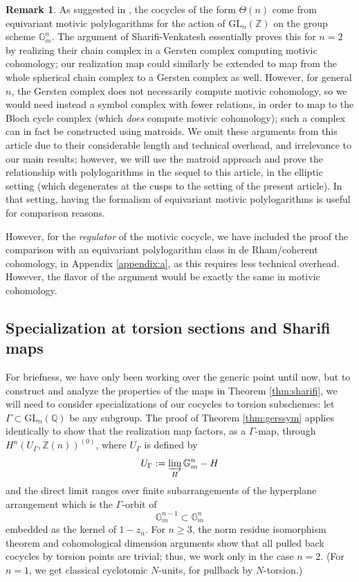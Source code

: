\documentclass[10pt]{amsart}
\theoremstyle{definition}
\newtheorem{rem}[thm]{Remark}
\newcommand{\Z}{\mathbb{Z}}
\newcommand{\G}{\mathbb{G}}
\newcommand{\GL}{\mathrm{GL}}
\numberwithin{equation}{section}
\begin{document}
    \begin{rem} \label{rem:eqpoly}
        As suggested in \cite[\S5]{SV}, the cocycles of the form $\Theta(n)$ come from equivariant motivic polylogarithms for the action of $\GL_n(\Z)$ on the group scheme $\G_m^n$. The argument of Sharifi-Venkatesh essentially proves this for $n=2$ by realizing their chain complex in a Gersten complex computing motivic cohomology; our realization map could similarly be extended to map from the whole spherical chain complex to a Gersten complex as well. However, for general $n$, the Gersten complex does not necessarily compute motivic cohomology, so we would need instead a symbol complex with fewer relations, in order to map to the Bloch cycle complex (which \emph{does} compute motivic cohomology); such a complex can in fact be constructed using matroids. We omit these arguments from this article due to their considerable length and technical overhead, and irrelevance to our main results; however, we will use the matroid approach and prove the relationship with polylogarithms in the sequel to this article, in the elliptic setting (which degenerates at the cusps to the setting of the present article). In that setting, having the formalism of equivariant motivic polylogarithms is useful for comparison reasons.

        However, for the \emph{regulator} of the motivic cocycle, we have included the proof the comparison with an equivariant polylogarithm class in de Rham/coherent cohomology, in Appendix \ref{appendix:a}, as this requires less technical overhead. However, the flavor of the argument would be exactly the same in motivic cohomology.
    \end{rem}

    \subsection{Specialization at torsion sections and Sharifi maps}
    
    For briefness, we have only been working over the generic point until now, but to construct and analyze the properties of the maps in Theorem \ref{thm:sharifi}, we will need to consider specializations of our cocycles to torsion subschemes: let $\Gamma\subset \mathrm{GL}_n(\mathbb{Q})$ be any subgroup. The proof of Theorem \ref{thm:gerssym} applies identically to show that the realization map factors, as a $\Gamma$-map, through $H^n(U_\Gamma, \Z(n))^{(0)}$, where $U_\Gamma$ is defined by
    \begin{equation} \label{eq:spreadgers}
        U_\Gamma := \varinjlim_H \mathbb{G}_m^n-H
    \end{equation}
    and the direct limit ranges over finite subarrangements of the hyperplane arrangement which is the $\Gamma$-orbit of 
    \[
    \mathbb{G}_m^{n-1}\subset \mathbb{G}_m^{n}
    \]
    embedded as the kernel of $1-z_n$. For $n\ge 3$, the norm residue isomorphism theorem and cohomological dimension arguments show that all pulled back cocycles by torsion points are trivial; thus, we work only in the case $n=2$. (For $n=1$, we get classical cyclotomic $N$-units, for pullback by $N$-torsion.) 
\end{document}
